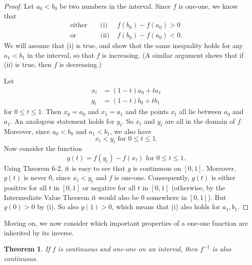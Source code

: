 \documentclass{article}
\newtheorem{theorem}{Theorem}
\begin{document}
\begin{proof}
  Let $a_0 < b_0$ be two numbers in the interval. Since $f$ is one-one, we know
  that \begin{align*}
    \text{either} &&\text{ (i) } &f(b_0) - f(a_0) > 0 \\
    \text{or} &&\text{ (ii) } &f(b_0) - f(a_0) < 0.
  \end{align*} We will assume that (i) is true, and show that the same
  inequality holds for any $a_1 < b_1$ in the interval, so that $f$ is
  increasing. (A similar argument shows that if (ii) is true, then $f$ is
  decreasing.)

  Let \begin{align*}
    x_t &= (1 - t)a_0 + ta_1 \\
    y_t &= (1 - t)b_0 + tb_1
  \end{align*} for $0 \leq t \leq 1$. Then $x_0 = a_0$ and $x_1 = a_1$ and the
  points $x_t$ all lie between $a_0$ and $a_1$. An analogous statement holds
  for $y_t$. So $x_t$ and $y_t$ are all in the domain of $f$. Moreover, since
  $a_0 < b_0$ and $a_1 < b_1$, we also have \begin{equation*}
    x_t < y_t \text{ for } 0 \leq t \leq 1.
  \end{equation*} Now consider the function \begin{equation*}
    g(t) = f(y_t) - f(x_t) \text{ for } 0 \leq t \leq 1.
  \end{equation*} Using Theorem 6-2, it is easy to see that $g$ is continuous
  on $[0, 1]$. Moreover, $g(t)$ is never 0, since $x_t < y_t$ and $f$ is
  one-one. Consequently, $g(t)$ is either positive for all $t$ in $[0, 1]$ or
  negative for all $t$ in $[0, 1]$ (otherwise, by the Intermediate Value
  Theorem it would also be 0 somewhere in $[0, 1]$). But $g(0) > 0$ by (i). So
  also $g(1) > 0$, which means that (i) also holds for $a_1, b_1$.
\end{proof}

Moving on, we now consider which important properties of a one-one function are
inherited by its inverse.

\begin{theorem}
  If $f$ is continuous and one-one on an interval, then $f^{-1}$ is also
  continuous.
\end{theorem}
\end{document}
